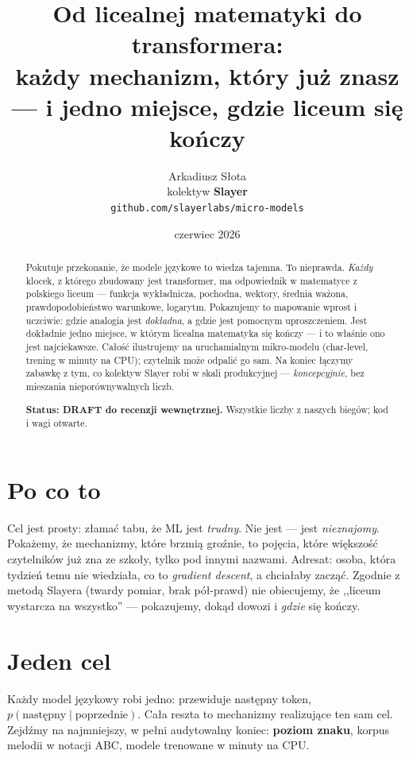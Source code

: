 \documentclass[11pt]{article}
\title{Od licealnej matematyki do transformera:\\
każdy mechanizm, który już znasz --- i jedno miejsce, gdzie liceum się kończy}
\author{Arkadiusz Słota \\ kolektyw \textbf{Slayer} \\ \texttt{github.com/slayerlabs/micro-models}}
\date{czerwiec 2026}
\begin{document}
\maketitle

\begin{abstract}
Pokutuje przekonanie, że modele językowe to wiedza tajemna. To nieprawda. \emph{Każdy} klocek, z którego
zbudowany jest transformer, ma odpowiednik w matematyce z polskiego liceum --- funkcja wykładnicza, pochodna,
wektory, średnia ważona, prawdopodobieństwo warunkowe, logarytm. Pokazujemy to mapowanie wprost i uczciwie:
gdzie analogia jest \emph{dokładna}, a gdzie jest pomocnym uproszczeniem. Jest dokładnie jedno miejsce, w którym
licealna matematyka się kończy --- i to właśnie ono jest najciekawsze. Całość ilustrujemy na uruchamialnym
mikro-modelu (char-level, trening w minuty na CPU); czytelnik może odpalić go sam. Na koniec łączymy zabawkę
z tym, co kolektyw Slayer robi w skali produkcyjnej --- \emph{koncepcyjnie}, bez mieszania nieporównywalnych liczb.

\textbf{Status: DRAFT do recenzji wewnętrznej.} Wszystkie liczby z naszych biegów; kod i wagi otwarte.
\end{abstract}

\section{Po co to}
Cel jest prosty: złamać tabu, że ML jest \emph{trudny}. Nie jest --- jest \emph{nieznajomy}. Pokażemy, że
mechanizmy, które brzmią groźnie, to pojęcia, które większość czytelników już zna ze szkoły, tylko pod innymi
nazwami. Adresat: osoba, która tydzień temu nie wiedziała, co to \emph{gradient descent}, a chciałaby zacząć.
Zgodnie z metodą Slayera (twardy pomiar, brak pół-prawd) nie obiecujemy, że ,,liceum wystarcza na wszystko''
--- pokazujemy, dokąd dowozi i \emph{gdzie} się kończy.

\section{Jeden cel}
Każdy model językowy robi jedno: przewiduje następny token, $p(\text{następny}\mid\text{poprzednie})$.
Cała reszta to mechanizmy realizujące ten sam cel. Zejdźmy na najmniejszy, w pełni audytowalny koniec:
\textbf{poziom znaku}, korpus melodii w notacji ABC, modele trenowane w minuty na CPU.
\end{document}
